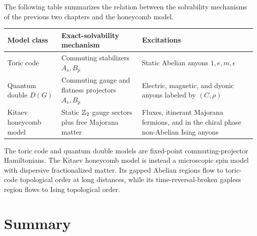 The following table summarizes the relation between the solvability mechanisms
of the previous two chapters and the honeycomb model.

\begin{center}
\begin{adjustbox}{max width=\textwidth}
\begin{tabular}{@{}L{0.24\textwidth}L{0.28\textwidth}L{0.32\textwidth}@{}}
\toprule
Model class & Exact-solvability mechanism & Excitations \\
\midrule
Toric code &
Commuting stabilizers \(A_s,B_p\) &
Static Abelian anyons \(1,e,m,\epsilon\) \\
\addlinespace
Quantum double \(D(G)\) &
Commuting gauge and flatness projectors \(A_v,B_p\) &
Electric, magnetic, and dyonic anyons labeled by \((C,\rho)\) \\
\addlinespace
Kitaev honeycomb model &
Static \(\mathbb{Z}_2\) gauge sectors plus free Majorana matter &
Fluxes, itinerant Majorana fermions, and in the chiral phase non-Abelian Ising anyons \\
\bottomrule
\end{tabular}
\end{adjustbox}
\end{center}

The toric code and quantum double models are fixed-point commuting-projector
Hamiltonians.  The Kitaev honeycomb model is instead a microscopic spin model
with dispersive fractionalized matter.  Its gapped Abelian regions flow to
toric-code topological order at long distances, while its time-reversal-broken
gapless region flows to Ising topological order.

\section{Summary}
\label{sec:kitaev-honeycomb-summary}

